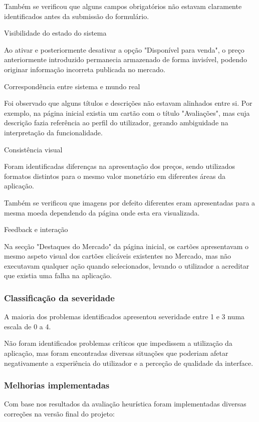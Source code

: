 \documentclass[12pt,a4paper]{article}
\begin{document}
Também se verificou que alguns campos obrigatórios não estavam claramente identificados antes da submissão do formulário.

Visibilidade do estado do sistema

Ao ativar e posteriormente desativar a opção "Disponível para venda", o preço anteriormente introduzido permanecia armazenado de forma invisível, podendo originar informação incorreta publicada no mercado.

Correspondência entre sistema e mundo real

Foi observado que alguns títulos e descrições não estavam alinhados entre si. Por exemplo, na página inicial existia um cartão com o título "Avaliações", mas cuja descrição fazia referência ao perfil do utilizador, gerando ambiguidade na interpretação da funcionalidade.

Consistência visual

Foram identificadas diferenças na apresentação dos preços, sendo utilizados formatos distintos para o mesmo valor monetário em diferentes áreas da aplicação.

Também se verificou que imagens por defeito diferentes eram apresentadas para a mesma moeda dependendo da página onde esta era visualizada.

Feedback e interação

Na secção "Destaques do Mercado" da página inicial, os cartões apresentavam o mesmo aspeto visual dos cartões clicáveis existentes no Mercado, mas não executavam qualquer ação quando selecionados, levando o utilizador a acreditar que existia uma falha na aplicação.

\subsubsection{Classificação da severidade}

A maioria dos problemas identificados apresentou severidade entre 1 e 3 numa escala de 0 a 4.

Não foram identificados problemas críticos que impedissem a utilização da aplicação, mas foram encontradas diversas situações que poderiam afetar negativamente a experiência do utilizador e a perceção de qualidade da interface.

\subsubsection{Melhorias implementadas}

Com base nos resultados da avaliação heurística foram implementadas diversas correções na versão final do projeto:
\end{document}
